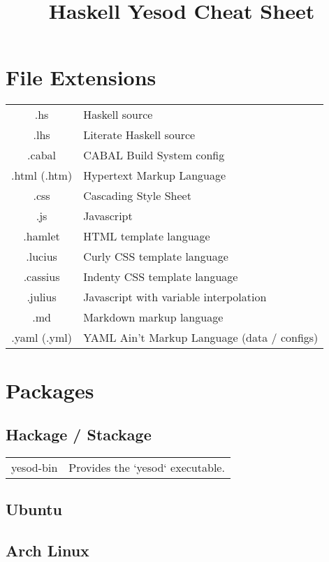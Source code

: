 \documentclass{refcard}
\title{Haskell Yesod Cheat Sheet}
\begin{document}
\maketitle

\section{File Extensions}

\begin{tabular}{Cl}
	.hs          & Haskell source \\
	.lhs         & Literate Haskell source \\
	.cabal       & CABAL Build System config \\[1ex]
	.html (.htm) & Hypertext Markup Language \\
	.css         & Cascading Style Sheet \\
	.js          & Javascript \\[1ex]
	.hamlet      & HTML template language \\
	.lucius      & Curly CSS template language \\
	.cassius     & Indenty CSS template language \\
	.julius      & Javascript with variable interpolation \\[1ex]
	.md          & Markdown markup language \\
	.yaml (.yml) & YAML Ain't Markup Language (data / configs) \\
\end{tabular}

\section{Packages}

\subsection{Hackage / Stackage}

\begin{tabular}{Cl}
	yesod-bin & Provides the `yesod` executable. \\
\end{tabular}

\subsection{Ubuntu}

\subsection{Arch Linux}
\end{document}
